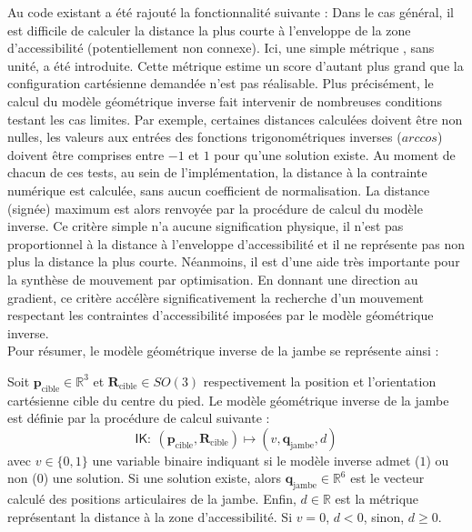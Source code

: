 Au code existant a été rajouté la fonctionnalité suivante :
Dans le cas général, il est difficile de calculer la distance la plus 
courte à l'enveloppe de la zone d'accessibilité (potentiellement non connexe).
Ici, une simple \og métrique \fg, sans unité, a été introduite.
Cette métrique estime un score d'autant plus grand que la configuration
cartésienne demandée n'est pas réalisable.
Plus précisément, le calcul du modèle géométrique inverse fait
intervenir de nombreuses conditions testant les cas limites.
Par exemple, certaines distances calculées doivent être non nulles, 
les valeurs aux entrées des fonctions trigonométriques inverses ($arccos$)
doivent être comprises entre $-1$ et $1$ pour qu'une solution existe.
Au moment de chacun de ces tests, au sein de l'implémentation, 
la distance à la contrainte numérique est calculée, 
sans aucun coefficient de normalisation.
La distance (signée) maximum est alors renvoyée par la procédure
de calcul du modèle inverse.
Ce critère simple n'a aucune signification physique, il n'est pas proportionnel 
à la distance à l'enveloppe d'accessibilité et il ne représente pas non plus
la distance la plus courte.
Néanmoins, il est d'une aide très importante pour la synthèse de mouvement
par optimisation. En donnant une direction au gradient, ce critère accélère
significativement la recherche d'un mouvement respectant les contraintes 
d'accessibilité imposées par le modèle géométrique inverse.\\

Pour résumer, le modèle géométrique inverse de la jambe se représente ainsi :
\begin{definition}
    Soit $\bm{p}_{\text{cible}} \in \mathbb{R}^3$ et
    $\bm{R}_{\text{cible}} \in SO(3)$ respectivement la position et l'orientation
    cartésienne cible du centre du pied.
    Le modèle géométrique inverse de la jambe est définie par 
    la procédure de calcul suivante :
    $$
    \mathsf{IK} :~ (\bm{p}_{\text{cible}}, \bm{R}_{\text{cible}}) 
    \longmapsto 
    (v, \bm{q}_{\text{jambe}}, d) 
    $$
    avec $v \in \{0,1\}$ une variable binaire indiquant si le modèle inverse
    admet ($1$) ou non ($0$) une solution.
    Si une solution existe, alors $\bm{q}_{\text{jambe}} \in \mathbb{R}^6$ 
    est le vecteur calculé des positions articulaires de la jambe.
    Enfin, $d \in \mathbb{R}$ est la métrique représentant la \og distance \fg
    à la zone d'accessibilité.
    Si $v = 0$, $d < 0$, sinon, $d \geqslant 0$.
\end{definition}

